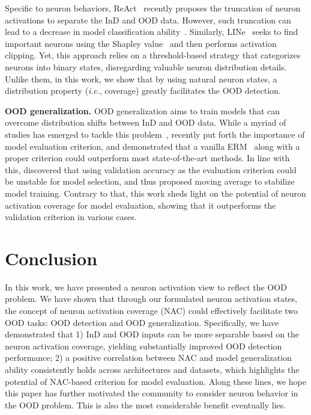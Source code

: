 \documentclass{article} \usepackage{iclr2024_conference,times}
\newcommand{\ie}{\textit{i}.\textit{e}.}
\newcommand{\bfstart}[1]{\noindent\textbf{#1.}}
\begin{document}
\vspace{-0.5mm}
Specific to neuron behaviors, ReAct~\citep{OOD_Detect:ReAct} recently proposes the truncation of neuron activations to separate the InD and OOD data. However, such truncation can lead to a decrease in model classification ability~\citep{OOD_Detect:SimpleAct}. 
Similarly, LINe~\citep{OOD_Detect:LINe} seeks to find important neurons using the Shapley value~\citep{Shapley1988AVF} and then performs activation clipping.
Yet, this approach relies on a threshold-based strategy that categorizes neurons into binary states, disregarding valuable neuron distribution details. 
Unlike them, in this work, we show that by using natural neuron states, a distribution property (\ie, coverage) greatly facilitates the OOD detection.





\vspace{-0.5mm}
\bfstart{OOD generalization} 
OOD generalization aims to train models that can overcome distribution shifts between InD and OOD data. 
While a myriad of studies has emerged to tackle this problem~\citep{Baseline:MMD,Baseline:CORAL,Baseline:GroupDRO,Baseline:AND-Mask,Baseline:IRM,Baseline:DANN,Baseline:MLDG,Baseline:V-REx}, \citet{Setup:DomainBed} recently put forth the importance of model evaluation criterion, and demonstrated that a vanilla ERM~\citep{Baseline:ERM} along with a proper criterion could outperform most state-of-the-art methods. 
In line with this, \citet{Criterion:SMA} discovered that using validation accuracy as the evaluation criterion could be unstable for model selection, and thus proposed moving average to stabilize model training.
Contrary to that, this work sheds light on the potential of neuron activation coverage for model evaluation, showing that it outperforms the validation criterion in various cases.







\vspace{-1mm}
\section{Conclusion}
\vspace{-1mm}
In this work, we have presented a neuron activation view to reflect the OOD problem. 
We have shown that through our formulated neuron activation states, the concept of neuron activation coverage (NAC) could effectively facilitate two OOD tasks: OOD detection and OOD generalization. 
Specifically, we have demonstrated that 1) InD and OOD inputs can be more separable based on the neuron activation coverage, yielding substantially improved OOD detection performance; 
2) a positive correlation between NAC and model generalization ability consistently holds across architectures and datasets, which highlights the potential of NAC-based criterion for model evaluation.
Along these lines, we hope this paper has further motivated the community to consider neuron behavior in the OOD problem. This is also the most considerable benefit eventually lies.
\end{document}
